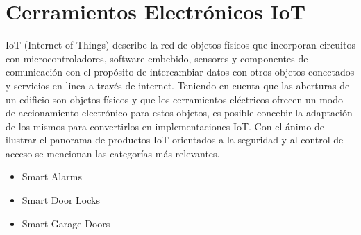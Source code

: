 \section{Cerramientos Electrónicos IoT}
IoT (Internet of Things) describe la red de objetos físicos que incorporan circuitos con microcontroladores, software embebido, sensores y componentes de comunicación con el propósito de intercambiar datos con otros objetos conectados y servicios en linea a través de internet.
Teniendo en cuenta que las aberturas de un edificio son objetos físicos y que los cerramientos eléctricos ofrecen un modo de accionamiento electrónico para estos objetos, es posible concebir la adaptación de los mismos para convertirlos en implementaciones IoT.
Con el ánimo de ilustrar el panorama de productos IoT orientados a la seguridad y al control de acceso se mencionan las categorías más relevantes.

\begin{itemize}
	\item Smart Alarms
	\item Smart Door Locks
	\item Smart Garage Doors
\end{itemize}

